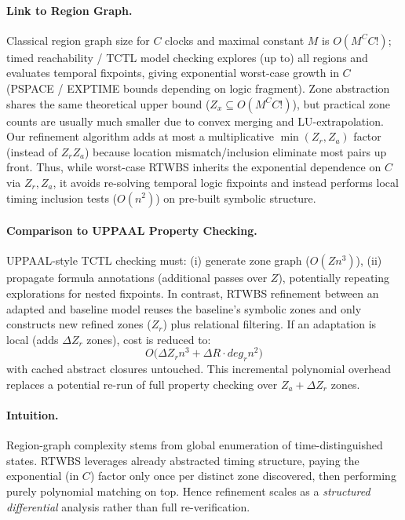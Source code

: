 \paragraph{Link to Region Graph.} Classical region graph size for $C$ clocks and maximal constant $M$ is $O(M^{C} C!)$; timed reachability / TCTL model checking explores (up to) all regions and evaluates temporal fixpoints, giving exponential worst-case growth in $C$ (PSPACE / EXPTIME bounds depending on logic fragment). Zone abstraction shares the same theoretical upper bound ($Z_x \subseteq O(M^{C} C!)$), but practical zone counts are usually much smaller due to convex merging and LU-extrapolation. Our refinement algorithm adds at most a multiplicative $\min(Z_r,Z_a)$ factor (instead of $Z_r Z_a$) because location mismatch/inclusion eliminate most pairs up front. Thus, while worst-case RTWBS inherits the exponential dependence on $C$ via $Z_r, Z_a$, it avoids re-solving temporal logic fixpoints and instead performs local timing inclusion tests ($O(n^2)$) on pre-built symbolic structure.

\paragraph{Comparison to UPPAAL Property Checking.} UPPAAL-style TCTL checking must: (i) generate zone graph ($O(Z n^3)$), (ii) propagate formula annotations (additional passes over $Z$), potentially repeating explorations for nested fixpoints. In contrast, RTWBS refinement between an adapted and baseline model reuses the baseline’s symbolic zones and only constructs new refined zones ($Z_r$) plus relational filtering. If an adaptation is local (adds $\Delta Z_r$ zones), cost is reduced to:
\[
  O\big( \Delta Z_r n^3 + \Delta R \cdot deg_r n^2 \big)
\]
with cached abstract closures untouched. This incremental polynomial overhead replaces a potential re-run of full property checking over $Z_a + \Delta Z_r$ zones.

\paragraph{Intuition.} Region-graph complexity stems from global enumeration of time-distinguished states. RTWBS leverages already abstracted timing structure, paying the exponential (in $C$) factor only once per distinct zone discovered, then performing purely polynomial matching on top. Hence refinement scales as a \emph{structured differential} analysis rather than full re-verification.

